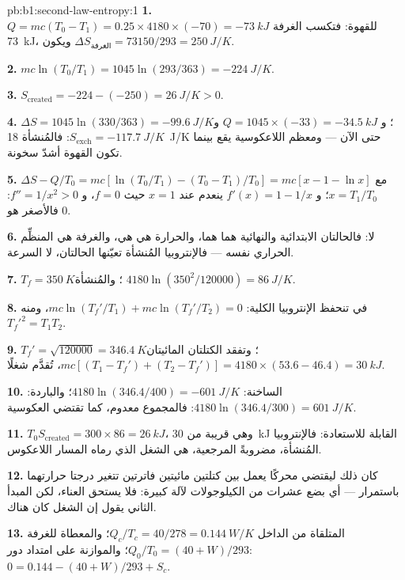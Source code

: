 \begin{solution}{pb:b1:second-law-entropy:1}
\textbf{1.} $Q = mc(T_0 - T_1) = 0.25 \times 4180 \times (-70) = \qty{-73}{kJ}$
للقهوة: فتكسب الغرفة \qty{73}{kJ}، ويكون $\Delta S_{\text{الغرفة}} = 73150/293
= \qty{+250}{J/K}$.

\textbf{2.} $mc\ln(T_0/T_1) = 1045\ln(293/363) = \qty{-224}{J/K}$.

\textbf{3.} $S_{\mathrm{created}} = -224 - (-250) = \qty{+26}{J/K} > 0$.

\textbf{4.} $\Delta S = 1045\ln(330/363) = \qty{-99.6}{J/K}$؛ و $Q = 1045 \times
(-33) = \qty{-34.5}{kJ}$ و $S_{\mathrm{exch}} = \qty{-117.7}{J/K}$: فالمُنشأة
\qty{18}{J/K} حتى الآن --- ومعظم اللاعكوسية يقع بينما تكون
القهوة أشدّ سخونة.

\textbf{5.} $\Delta S - Q/T_0 = mc[\ln(T_0/T_1) - (T_0 - T_1)/T_0] = mc[x - 1 -
\ln x]$ مع $x = T_1/T_0$؛ و $f'(x) = 1 - 1/x$ ينعدم عند $x = 1$ حيث
$f = 0$، و $f'' = 1/x^2 > 0$: فالأصغر هو $0$.

\textbf{6.} لا: فالحالتان الابتدائية والنهائية هما هما، والحرارة هي
هي، والغرفة هي المنظِّم الحراري نفسه --- فالإنتروبيا المُنشأة تعيّنها
الحالتان، لا السرعة.

\textbf{7.} $T_f = \qty{350}{K}$؛ والمُنشأة $4180\ln(350^2/120000) = \qty{86}{J/K}$.

\textbf{8.} في  تنحفظ الإنتروبيا الكلية: $mc\ln(T_f'/T_1) + mc\ln(T_f'/
T_2) = 0$، ومنه $T_f'^2 = T_1T_2$.

\textbf{9.} $T_f' = \sqrt{120000} = \qty{346.4}{K}$؛ وتفقد الكتلتان المائيتان $mc[(T_1 -
T_f') + (T_2 - T_f')] = 4180 \times (53.6 - 46.4) = \qty{30}{kJ}$، تُقدَّم
شغلًا.

\textbf{10.} الساخنة: $4180\ln(346.4/400) = \qty{-601}{J/K}$؛ والباردة: $4180\ln(346.4/
300) = \qty{+601}{J/K}$: فالمجموع معدوم، كما تقتضي العكوسية.

\textbf{11.} $T_0S_{\mathrm{created}} = 300 \times 86 = \qty{26}{kJ}$، وهي قريبة من
\qty{30}{kJ} القابلة للاستعادة: فالإنتروبيا المُنشأة، مضروبةً 
المرجعية، هي الشغل الذي رماه المسار اللاعكوس.

\textbf{12.} كان ذلك ليقتضي محركًا يعمل بين كتلتين مائيتين
فاترتين تتغير درجتا حرارتهما باستمرار --- أي بضع عشرات من الكيلوجولات
لآلة كبيرة: فلا يستحق العناء، لكن المبدأ الثاني يقول إن الشغل كان
هناك.

\textbf{13.} المتلقاة من الداخل $Q_c/T_c = 40/278 = \qty{0.144}{W/K}$؛
والمعطاة للغرفة $Q_0/T_0 = (40 + W)/293$؛ والموازنة على امتداد دور:
$0 = 0.144 - (40 + W)/293 + S_c$.


\end{solution}
